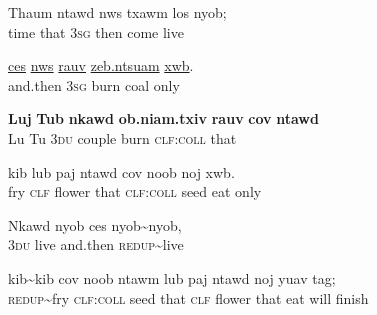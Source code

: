 \documentclass[output=paper]{LSP/langsci}
\begin{document}
\begin{exe}
\ex \label{JaexApp23}
\gll Thaum ntawd nws txawm los nyob;\\
     time that \textsc{3sg} then come live\\
\glt  {}
\end{exe}

\begin{exe}
\ex \label{JaexApp24}
\gll \underline{ces} \underline{nws} \underline{rauv} \underline{zeb.ntsuam} \underline{xwb}.\\
     and.then 3\textsc{sg} burn coal only\\
\glt  {}
\end{exe}

\begin{exe}
\ex \label{JaexApp25}
\gll \textbf{Luj} \textbf{Tub} \textbf{nkawd} \textbf{ob.niam.txiv} \textbf{rauv} \textbf{cov} \textbf{ntawd}\\
     Lu Tu 3\textsc{du} couple burn \textsc{clf:coll} that\\
\glt  {}
\end{exe}

\begin{exe}
\ex \label{JaexApp26}
\gll kib lub paj ntawd cov noob noj xwb.\\
     fry \textsc{clf} flower that \textsc{clf:coll} seed eat only\\
\glt {}
\end{exe}

\begin{exe}
\ex \label{JaexApp27}
\gll Nkawd nyob ces nyob{\textasciitilde}nyob,\\
     3\textsc{du} live and.then \textsc{redup}{\textasciitilde}live\\
\glt {}
\end{exe}

\begin{exe}
\ex \label{JaexApp28}
\gll kib{\textasciitilde}kib cov noob ntawm lub paj ntawd noj yuav tag;\\
     \textsc{redup}{\textasciitilde}fry \textsc{clf:coll} seed that \textsc{clf} flower that eat will finish\\
\glt {}
\end{exe}
\end{document}
